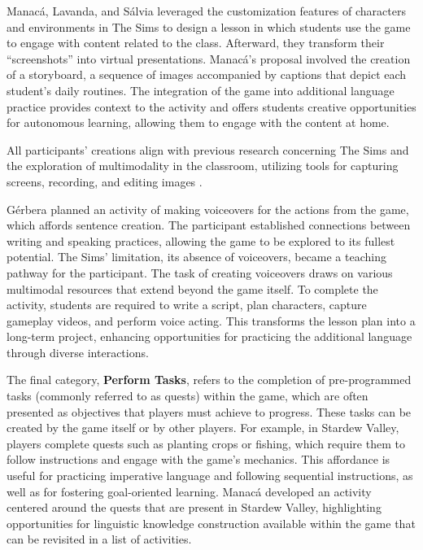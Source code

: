 \documentclass[english]{textolivre}
\begin{document}
Manacá, Lavanda, and Sálvia leveraged the customization features of characters and environments in The Sims to design a lesson in which students use the game to engage with content related to the class. Afterward, they transform their “screenshots” into virtual presentations. Manacá’s proposal involved the creation of a storyboard, a sequence of images accompanied by captions that depict each student’s daily routines. The integration of the game into additional language practice provides context to the activity and offers students creative opportunities for autonomous learning, allowing them to engage with the content at home.

All participants’ creations align with previous research concerning The Sims and the exploration of multimodality in the classroom, utilizing tools for capturing screens, recording, and editing images \cite{purushotma2006sims,valadares2022videogames}.

Gérbera planned an activity of making voiceovers for the actions from the game, which affords sentence creation. The participant established connections between writing and speaking practices, allowing the game to be explored to its fullest potential. The Sims’ limitation, its absence of voiceovers, became a teaching pathway for the participant. The task of creating voiceovers draws on various multimodal resources that extend beyond the game itself. To complete the activity, students are required to write a script, plan characters, capture gameplay videos, and perform voice acting. This transforms the lesson plan into a long-term project, enhancing opportunities for practicing the additional language through diverse interactions.

The final category, \textbf{Perform Tasks}, refers to the completion of pre-programmed tasks (commonly referred to as quests) within the game, which are often presented as objectives that players must achieve to progress. These tasks can be created by the game itself or by other players. For example, in Stardew Valley, players complete quests such as planting crops or fishing, which require them to follow instructions and engage with the game’s mechanics. This affordance is useful for practicing imperative language and following sequential instructions, as well as for fostering goal-oriented learning. Manacá developed an activity centered around the quests that are present in Stardew Valley, highlighting opportunities for linguistic knowledge construction available within the game that can be revisited in a list of activities.
\end{document}
